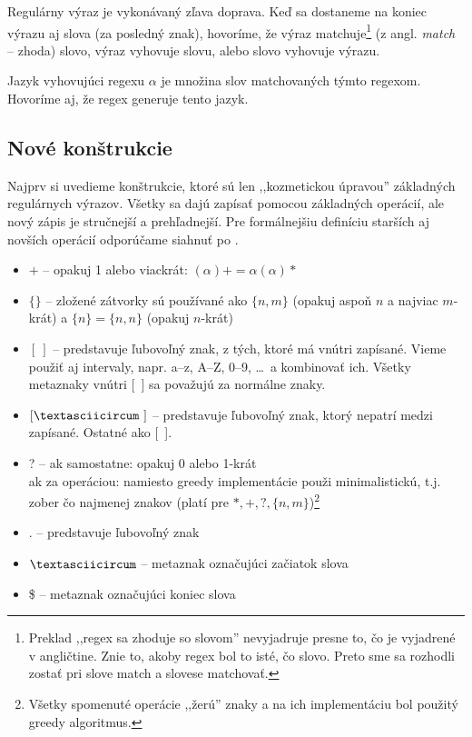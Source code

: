 Regulárny výraz je vykonávaný zľava doprava. Keď sa dostaneme na koniec výrazu aj slova (za posledný znak), hovoríme, že výraz matchuje\footnote{Preklad ,,regex sa zhoduje so slovom'' nevyjadruje presne to, čo je vyjadrené v angličtine. Znie to, akoby regex bol to isté, čo slovo. Preto sme sa rozhodli zostať pri slove match a slovese matchovať.} (z angl. \textit{match} -- zhoda) slovo, výraz vyhovuje slovu, alebo slovo vyhovuje výrazu.

Jazyk vyhovujúci regexu $\alpha$ je množina slov matchovaných týmto regexom. Hovoríme aj, že regex generuje tento jazyk.

\subsection{Nové konštrukcie}

Najprv si uvedieme konštrukcie, ktoré sú len ,,kozmetickou úpravou'' základných regulárnych výrazov. Všetky sa dajú zapísať pomocou základných operácií, ale nový zápis je stručnejší a prehľadnejší. Pre formálnejšiu definíciu starších aj novších operácií odporúčame siahnuť po \cite{mojaBak}.
\begin{itemize}
\item $+$ -- opakuj 1 alebo viackrát: $(\alpha)+=\alpha(\alpha)*$
\item $\lbrace \rbrace$ -- zložené zátvorky sú používané ako $\{n,m\}$ (opakuj aspoň $n$ a najviac $m$-krát) a $\{n\}=\{n,n\}$ (opakuj $n$-krát)
\item $[~]$ -- predstavuje ľubovoľný znak, z tých, ktoré má vnútri zapísané. Vieme použiť aj intervaly, napr. a--z, A--Z, 0--9, \dots~a kombinovať ich. Všetky metaznaky vnútri [~] sa považujú za normálne znaky.
\item $[\textasciicircum~]$ -- predstavuje ľubovoľný znak, ktorý nepatrí medzi zapísané. Ostatné ako [~].
\item ? -- ak samostatne: opakuj 0 alebo 1-krát \\
ak za operáciou: namiesto greedy implementácie použi minimalistickú, t.j. zober čo najmenej znakov (platí pre $*,+,?,\lbrace n,m \rbrace$)\footnote{Všetky spomenuté operácie ,,žerú'' znaky a na ich implementáciu bol použitý greedy algoritmus.}
\item . -- predstavuje ľubovoľný znak
\item $\textasciicircum$ -- metaznak označujúci začiatok slova
\item \$ -- metaznak označujúci koniec slova
\end{itemize}

